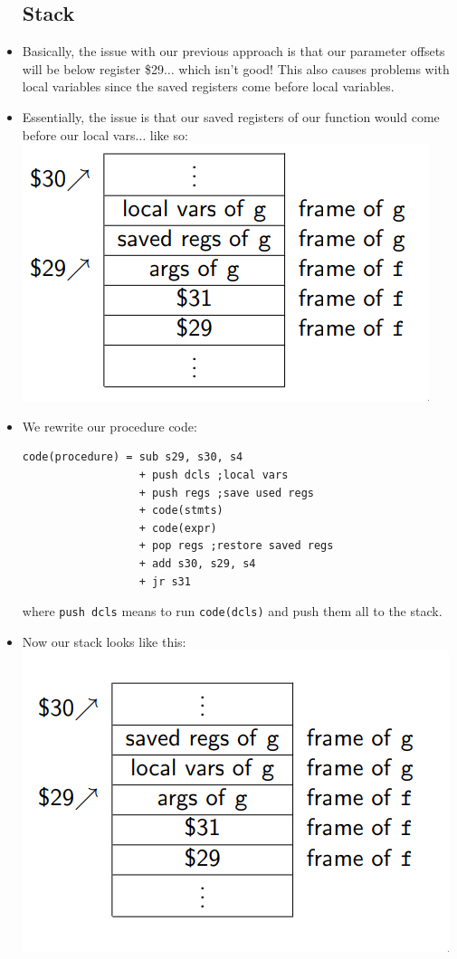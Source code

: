 \documentclass[12pt]{article}
\begin{document}
\begin{itemize}
    \subsection{Stack}
        \item Basically, the issue with our previous approach is that our parameter offsets will be below register \$29$\dots$ which isn't good!  This also causes problems with local variables since the saved registers come before local variables.
        \item Essentially, the issue is that our saved registers of our function would come before our local vars$\dots$ like so:\\
            \includegraphics[scale=0.5]{stack_1.png}
        \item We rewrite our procedure code:
\begin{lstlisting}[mathescape, numbers=none, breaklines=true]
code(procedure) = sub s29, s30, s4
                  + push dcls ;local vars
                  + push regs ;save used regs
                  + code(stmts)
                  + code(expr)
                  + pop regs ;restore saved regs
                  + add s30, s29, s4
                  + jr s31
\end{lstlisting}
        where \lstinline[mathescape]{push dcls} means to run \lstinline[mathescape]{code(dcls)} and push them all to the stack.
        \item Now our stack looks like this:\\
            \includegraphics[scale=0.5]{stack_2.png}

\end{itemize}
\end{document}
